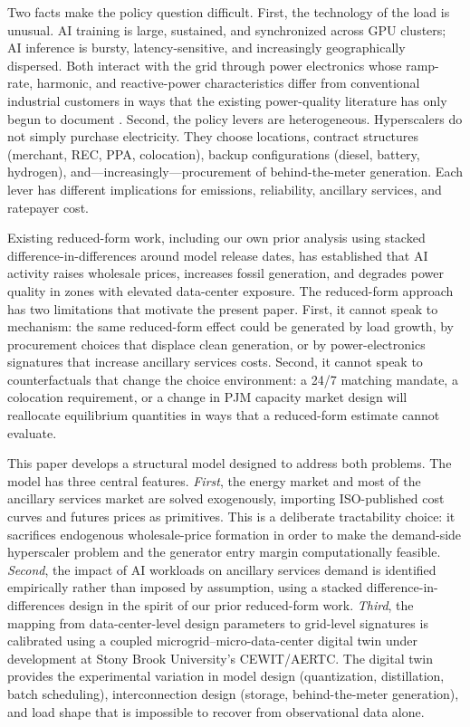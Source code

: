 \documentclass[12pt,letterpaper]{article}
\begin{document}
Two facts make the policy question difficult. First, the technology of the
load is unusual. AI training is large, sustained, and synchronized across
GPU clusters; AI inference is bursty, latency-sensitive, and increasingly
geographically dispersed. Both interact with the grid through power electronics
whose ramp-rate, harmonic, and reactive-power characteristics differ from
conventional industrial customers in ways that the existing power-quality
literature has only begun to document \citep{LaughnerEtAl_2024_THDonUSGrid,
WhiskerLabs_THD_2024}. Second, the policy levers are heterogeneous. Hyperscalers
do not simply purchase electricity. They choose locations, contract structures
(merchant, REC, PPA, colocation), backup configurations (diesel, battery,
hydrogen), and---increasingly---procurement of behind-the-meter generation.
Each lever has different implications for emissions, reliability, ancillary
services, and ratepayer cost.

Existing reduced-form work, including our own prior analysis using stacked
difference-in-differences around model release dates, has established that
AI activity raises wholesale prices, increases fossil generation, and
degrades power quality in zones with elevated data-center exposure. The
reduced-form approach has two limitations that motivate the present paper.
First, it cannot speak to mechanism: the same reduced-form effect could be
generated by load growth, by procurement choices that displace clean
generation, or by power-electronics signatures that increase ancillary
services costs. Second, it cannot speak to counterfactuals that change the
choice environment: a 24/7 matching mandate, a colocation requirement, or
a change in PJM capacity market design will reallocate equilibrium
quantities in ways that a reduced-form estimate cannot evaluate.

This paper develops a structural model designed to address both problems. The
model has three central features. \emph{First}, the energy market and most
of the ancillary services market are solved exogenously, importing
ISO-published cost curves and futures prices as primitives. This is a
deliberate tractability choice: it sacrifices endogenous wholesale-price
formation in order to make the demand-side hyperscaler problem and the
generator entry margin computationally feasible. \emph{Second}, the impact of
AI workloads on ancillary services demand is identified empirically rather
than imposed by assumption, using a stacked difference-in-differences design
in the spirit of our prior reduced-form work. \emph{Third}, the mapping from
data-center-level design parameters to grid-level signatures is calibrated
using a coupled microgrid--micro-data-center digital twin under
development at Stony Brook University's CEWIT/AERTC. The digital twin
provides the experimental variation in model design (quantization,
distillation, batch scheduling), interconnection design (storage,
behind-the-meter generation), and load shape that is impossible to recover
from observational data alone.
\end{document}
